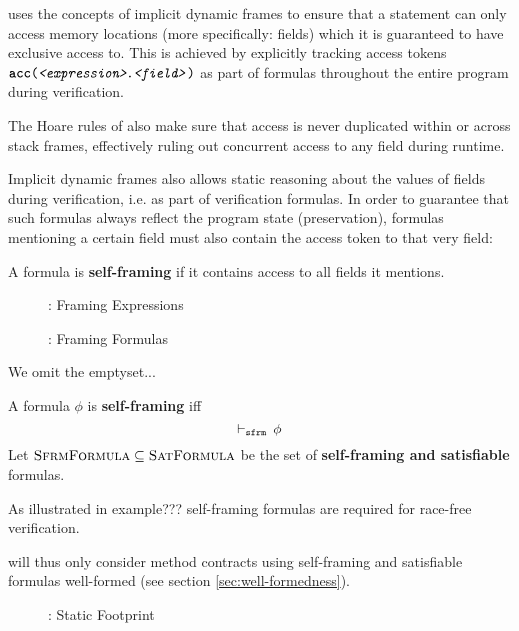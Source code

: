 


\svl uses the concepts of implicit dynamic frames to ensure that a statement can only access memory locations (more specifically: fields) which it is guaranteed to have exclusive access to.
This is achieved by explicitly tracking access tokens $\textup{\texttt{\textbf{acc}(\textit{<expression>}.\textit{<field>})}}$ as part of formulas throughout the entire program during verification.
    
The Hoare rules of \svl also make sure that access is never duplicated within or across stack frames, effectively ruling out concurrent access to any field during runtime.

Implicit dynamic frames also allows static reasoning about the values of fields during verification, i.e. as part of verification formulas.
In order to guarantee that such formulas always reflect the program state (preservation), formulas mentioning a certain field must also contain the access token to that very field:
\begin{definition}
    A formula is \textbf{self-framing} if it contains access to all fields it mentions.
\end{definition}


\begin{figure}
    
    \caption{\svlidf: Framing Expressions}
\end{figure}

\begin{figure}
    
    \caption{\svlidf: Framing Formulas}
\end{figure}

We omit the emptyset... 

\begin{definition}
    A formula $\phi$ is \textbf{self-framing} iff
    \begin{displaymath}
    \vdash_\texttt{sfrm}\, \phi
    \end{displaymath}
    Let $\textup{\textsc{SfrmFormula}} \subseteq \textup{\textsc{SatFormula}}$ be the set of \textbf{self-framing and satisfiable} formulas.
\end{definition}

As illustrated in example??? self-framing formulas are required for race-free verification.

\svl will thus only consider method contracts using self-framing and satisfiable formulas well-formed (see section \ref{sec:well-formedness}).

\begin{figure}
    
    \caption{\svlidf: Static Footprint}
\end{figure}

